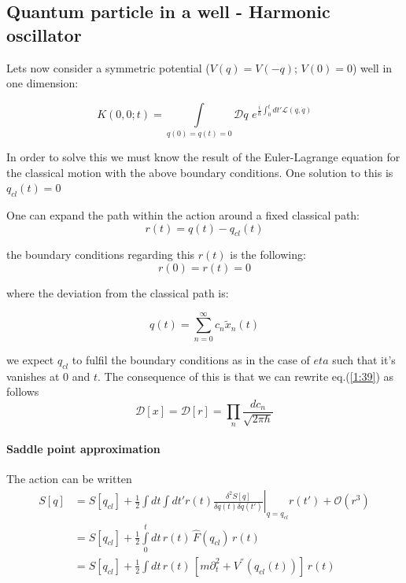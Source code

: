 \documentclass[12pt,a4paper]{article}
\numberwithin{equation}{section}
\begin{document}
\subsection{Quantum particle in a well - Harmonic oscillator}
Lets now consider a symmetric potential ($V(q) = V(-q)$; $V(0) = 0$) well in one dimension:

\begin{equation}
K(0,0;t) = \int\limits_{q(0) = q(t) = 0} \mathcal{D}q\,\, e^{\frac{i}{\hbar}\int_0^t dt' \mathcal{L}(q,\dot{q})}
\end{equation}

In order to solve this we must know the result of the Euler-Lagrange equation for the classical motion with the above boundary conditions. One solution to this is $q_{cl}(t) =0$

One can expand the path within the action around a fixed classical path:
\begin{equation}
r(t) = q (t) - q_{cl}(t)
\end{equation}

the boundary conditions regarding this $r(t)$ is the following:
\begin{equation}
r(0) = r(t) = 0
\end{equation}

where the deviation from the classical path is:

\begin{equation}
q (t) = \sum\limits_{n = 0}^{\infty} c_n \tilde{x}_n(t)
\end{equation}

we expect $q_{cl}$ to fulfil the boundary conditions as in the case of $eta$ such that it's vanishes at $0$ and $t$. The consequence of this is that we can rewrite eq.(\ref{1:39}) as follows
\begin{equation}
\mathcal{D}[x] = \mathcal{D}[r] = \prod_n \frac{dc_n}{\sqrt{2\pi\hbar}}
\end{equation}

\paragraph{Saddle point approximation} 
The action can be written
\begin{align}
S[q] &= S[q_{cl}] + \frac{1}{2}  \int dt \int dt' r(t) \left.\frac{\delta^2 S[q]}{\delta q(t) \delta q(t')} \right|_{q = q_{cl}} r(t') + \mathcal{O}(r^3) \\
&= S[q_{cl}] + \frac{1}{2} \int\limits_{0}^{t} dt\, r(t)\, \hat{F}(q_{cl})\, r(t)\\
&= S[q_{cl}] + \frac{1}{2} \int dt\, r(t)\, \left[ m\partial^2_t + V^{''}(q_{cl}(t))  \right]\, r(t)
\end{align}
\end{document}
